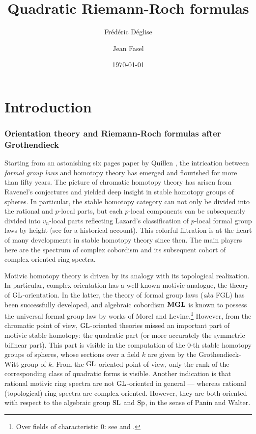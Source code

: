\documentclass[11pt,leqno]{amsart}
\title{Quadratic Riemann-Roch formulas}
\author{Fr\'ed\'eric D\'eglise}
\author{Jean Fasel}
\date{\today}
\theoremstyle{remark}
\theoremstyle{definition}
\numberwithin{equation}{thm}
\begin{document}

\maketitle

\setcounter{tocdepth}{2}
\tableofcontents

\section*{Introduction}

\subsubsection*{Orientation theory and Riemann-Roch formulas after Grothendieck}

Starting from an astonishing six pages paper by Quillen \cite{QuiCob}, the intrication between \emph{formal group laws}
 and homotopy theory has emerged and flourished for more than fifty years.
 The picture of chromatic homotopy theory has arisen from Ravenel's conjectures and yielded deep insight in stable homotopy groups of spheres.
 In particular, the stable homotopy category can not only be divided into the rational and $p$-local parts,
 but each $p$-local components can be subsequently divided into $v_n$-local parts reflecting
 Lazard's classification of $p$-local formal group laws by height (see \cite{BBchrom} for a historical account).
 This colorful filtration is at the heart of many developments in stable homotopy theory since then.
 The main players here are the spectrum of complex cobordism
 and its subsequent cohort of complex oriented ring spectra.

Motivic homotopy theory is driven by its analogy with its topological realization.
 In particular, complex orientation has a well-known motivic analogue, the theory of $\mathrm{GL}$-orientation.
 In the latter, the theory of formal group laws (\emph{aka} FGL) has been successfully developed, and algebraic cobordism $\mathbf{MGL}$
 is known to possess the universal formal group law by works of Morel and
 Levine.\footnote{Over fields of characteristic $0$: see \cite{LMcobord}
 and \cite{LevMGL}.}
 However, from the chromatic point of view, $\mathrm{GL}$-oriented theories missed an important
 part of motivic stable homotopy: the quadratic part (or more accurately the symmetric bilinear part). This part is visible
 in the computation of the $0$-th stable homotopy groups of spheres, whose sections over a field $k$
 are given by the Grothendieck-Witt group of $k$. From the $\mathrm{GL}$-oriented point of view,
 only the rank of the corresponding class of quadratic forms is visible.
 Another indication is that rational motivic ring spectra
 are not $\mathrm{GL}$-oriented in general --- whereas rational (topological) ring spectra are complex
 oriented. However, they are both oriented with respect to the algebraic group
 $\mathrm{SL}$ and $\mathrm{Sp}$, in the sense of Panin and Walter.
\end{document}
